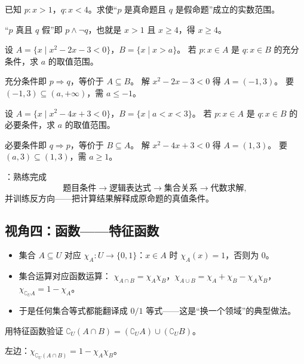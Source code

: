 \begin{explore}
\begin{example}
已知 $p:x>1$，$q:x<4$。求使“$p$ 是真命题且 $q$ 是假命题”成立的实数范围。
\end{example}
\begin{solution}
“$p$ 真且 $q$ 假”即 $p\land\neg q$，也就是 $x>1$ 且 $x\geq4$，得 $x\geq4$。
\end{solution}

\begin{example}
设 $A=\{x\mid x^2-2x-3<0\}$，$B=\{x\mid x>a\}$。
若 $p:x\in A$ 是 $q:x\in B$ 的充分条件，求 $a$ 的取值范围。
\end{example}
\begin{solution}
充分条件即 $p\Rightarrow q$，等价于 $A\subseteq B$。
解 $x^2-2x-3<0$ 得 $A=(-1,3)$。
要 $(-1,3)\subseteq(a,+\infty)$，需 $a\leq-1$。
\end{solution}

\begin{problem}
设 $A=\{x\mid x^2-4x+3<0\}$，$B=\{x\mid a<x<3\}$。
若 $p:x\in A$ 是 $q:x\in B$ 的必要条件，求 $a$ 的取值范围。
\end{problem}
\begin{solution}
必要条件即 $q\Rightarrow p$，等价于 $B\subseteq A$。
解 $x^2-4x+3<0$ 得 $A=(1,3)$。
要 $(a,3)\subseteq(1,3)$，需 $a\geq1$。
\end{solution}

：熟练完成
\[
  \text{题目条件}\to\text{逻辑表达式}\to\text{集合关系}\to\text{代数求解},
\]
并训练反方向——把计算结果解释成原命题的真值条件。

\subsection{视角四：函数——特征函数}

\begin{itemize}
  \item 集合 $A\subseteq U$ 对应 $\chi_A:U\to\{0,1\}$：$x\in A$ 时 $\chi_A(x)=1$，否则为 $0$。
  \item 集合运算对应函数运算：
  $\chi_{A\cap B}=\chi_A\chi_B$，$\chi_{A\cup B}=\chi_A+\chi_B-\chi_A\chi_B$，$\chi_{\complement_U A}=1-\chi_A$。
  \item 于是任何集合等式都能翻译成 $0/1$ 等式——这是“换一个领域”的典型做法。
\end{itemize}

\begin{example}
用特征函数验证 $\complement_U(A\cap B)=(\complement_U A)\cup(\complement_U B)$。
\end{example}
\begin{solution}
左边：$\chi_{\complement_U(A\cap B)}=1-\chi_A\chi_B$。


\end{solution}
\end{explore}
